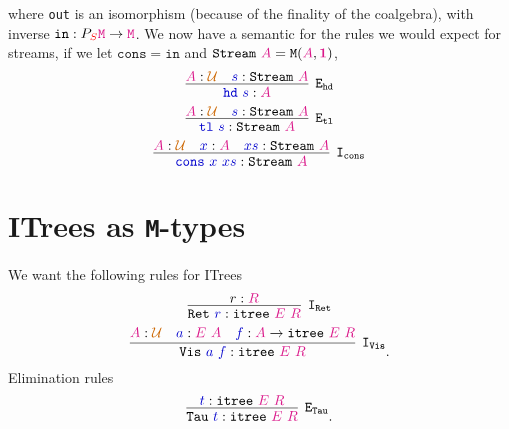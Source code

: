 \documentclass[twoside,11pt,openright]{report}
\newcommand*{\term}[1]{\textcolor{blue!80!black}{#1}}
\newcommand*{\type}[1]{\textcolor{magenta!90!black}{#1}}
\newcommand*{\container}[1]{\textcolor{red}{#1}}
\newcommand*{\universe}[1]{\textcolor{orange!80!black}{#1}}
\newcommand*{\unit}{\type{\textbf{1}}}
\begin{document}
where \texttt{out} is an isomorphism (because of the finality of the coalgebra), with inverse \(\mathtt{in} : P_{\container{S}}\type{\mathtt{M}} \rightarrow \type{\mathtt{M}}\). We now have a semantic for the rules we would expect for streams, if we let \(\mathtt{cons} = \mathtt{in}\) and \(\mathtt{Stream}~\type{A} = \mathtt{M}(\type{A},\unit)\),
\begin{equation}
  \infer[\mathtt{E}_{\mathtt{hd}}]{\term{\mathtt{hd}}~\term{s} : \type{A}}{\type{A} : \universe{\mathcal{U}} & \term{s} : \mathtt{Stream}~\type{A}}
\end{equation}
\begin{equation}
  \infer[\mathtt{E}_{\mathtt{tl}}]{\term{\mathtt{tl}}~\term{s} : \mathtt{Stream}~\type{A}}{\type{A} : \universe{\mathcal{U}} & \term{s} : \mathtt{Stream}~\type{A}}
\end{equation}
\begin{equation}
  \infer[\mathtt{I}_{\mathtt{cons}}]{\term{\mathtt{cons}}~\term{x}~\term{xs} : \mathtt{Stream}~\type{A}}{\type{A} : \universe{\mathcal{U}} & \term{x} : \type{A} & \term{xs} : \mathtt{Stream}~\type{A}}
\end{equation}

\section{ITrees as \texttt{M}-types}
We want the following rules for ITrees
\begin{equation}
  \infer [\mathtt{I}_\mathtt{Ret}]{\mathtt{Ret}~\term{r} : \mathtt{itree}~\type{E}~\type{R}}{r : \type{R}}
\end{equation}
\begin{equation}
  \infer[\mathtt{I}_\mathtt{Vis}]{\mathtt{Vis}~\term{a}~\term{f} : \mathtt{itree}~\type{E}~\type{R}}{\type{A} : \universe{\mathcal{U}} & \term{a} : \type{E}~\type{A} & \term{f} : \type{A} \rightarrow \texttt{itree}~\type{E}~\type{R}}.
\end{equation}
Elimination rules
\begin{equation}
  \infer[\mathtt{E}_\mathtt{Tau}]{\mathtt{Tau}~\term{t} : \mathtt{itree}~\type{E}~\type{R}}{\term{t} : \mathtt{itree}~\type{E}~\type{R}}.
\end{equation}
\end{document}
